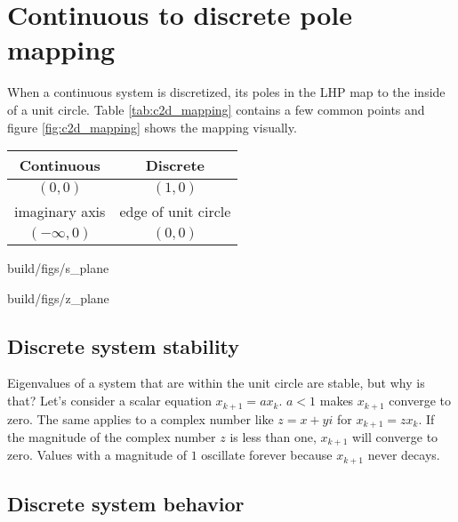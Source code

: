 \section{Continuous to discrete pole mapping}

When a continuous system is discretized, its poles in the LHP map to the inside
of a unit circle. Table \ref{tab:c2d_mapping} contains a few common points and
figure \ref{fig:c2d_mapping} shows the mapping visually.
\begin{booktable}
  \begin{tabular}{|cc|}
    \hline
    \rowcolor{headingbg}
    \textbf{Continuous} & \textbf{Discrete} \\
    \hline
    $(0, 0)$ & $(1, 0)$ \\
    imaginary axis & edge of unit circle \\
    $(-\infty, 0)$ & $(0, 0)$ \\
    \hline
  \end{tabular}
  \caption{Mapping from continuous to discrete}
  \label{tab:c2d_mapping}
\end{booktable}
\begin{bookfigure}
  \begin{minisvg}{2}{build/figs/s_plane}
  \end{minisvg}
  \hfill
  \begin{minisvg}{2}{build/figs/z_plane}
  \end{minisvg}
  \caption{Mapping of complex plane from continuous (left) to discrete (right)}
  \label{fig:c2d_mapping}
\end{bookfigure}

\subsection{Discrete system stability}

Eigenvalues of a \gls{system} that are within the unit circle are stable, but
why is that? Let's consider a scalar equation $x_{k + 1} = ax_k$. $a < 1$ makes
$x_{k + 1}$ converge to zero. The same applies to a complex number like
$z = x + yi$ for $x_{k + 1} = zx_k$. If the magnitude of the complex number $z$
is less than one, $x_{k+1}$ will converge to zero. Values with a magnitude of
$1$ oscillate forever because $x_{k+1}$ never decays.

\subsection{Discrete system behavior}

